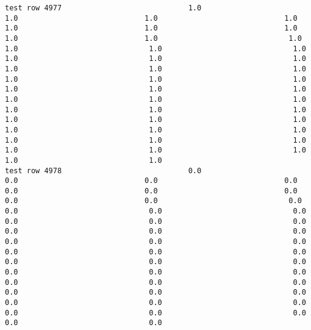 \documentclass[11pt]{article}
\begin{document}
\begin{verbatim}
test row 4977                             1.0                             1.0                             1.0                             1.0                             1.0                             1.0                             1.0                             1.0                             1.0                              1.0                              1.0                              1.0                              1.0                              1.0                              1.0                              1.0                              1.0                              1.0                              1.0                              1.0                              1.0                              1.0                              1.0                              1.0                              1.0                              1.0                              1.0                              1.0                              1.0                              1.0                              1.0                              1.0                              1.0                              1.0                              1.0                              1.0                              1.0                              1.0                              1.0                              1.0                              1.0                              1.0                              1.0                              1.0                              1.0
test row 4978                             0.0                             0.0                             0.0                             0.0                             0.0                             0.0                             0.0                             0.0                             0.0                              0.0                              0.0                              0.0                              0.0                              0.0                              0.0                              0.0                              0.0                              0.0                              0.0                              0.0                              0.0                              0.0                              0.0                              0.0                              0.0                              0.0                              0.0                              0.0                              0.0                              0.0                              0.0                              0.0                              0.0                              0.0                              0.0                              0.0                              0.0                              0.0                              0.0                              0.0                              0.0                              0.0                              0.0                              0.0                              0.0

\end{verbatim}
\end{document}
